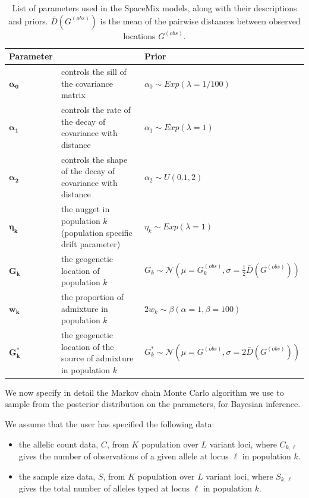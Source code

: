\documentclass[12pt]{article}
\newcommand{\identifyadmixsource}[1]{{#1^{*}}}
\begin{document}
\begin{centering}
\begin{table}
\begin{tabular}{| >{\centering\arraybackslash}m{2.0cm} | m{5.2cm} | >{\centering\arraybackslash}m{6.8cm} |}
	\hline
	\textbf{Parameter} & \centering{\textbf{Description}} & \textbf{Prior}\\ \hline
	$\boldsymbol{\alpha_0}$ & 
		controls the sill of the covariance matrix & 
		$\alpha_0 \sim Exp(\lambda = 1/100)$\\ \hline
	$\boldsymbol{\alpha_1}$ & 
		controls the rate of the decay of covariance with distance & 
		$\alpha_1 \sim Exp(\lambda = 1)$\\ \hline
	$\boldsymbol{\alpha_2}$ & 
		controls the shape of the decay of covariance with distance & 
		$\alpha_2 \sim U(0.1,2)$\\ \hline
	$\boldsymbol{\eta_k}$ & 
		the nugget in population $k$ (population specific drift parameter)  & 
		$\eta_k \sim Exp(\lambda = 1)$\\ \hline
	$\boldsymbol{G_k}$ & 
		the geogenetic location of population $k$ &
		 $G_k \sim \mathcal{N}(\mu = G^{(obs)}_k,\sigma = \frac{1}{2}\bar{D}(G^{(obs)}))$ \\ \hline
	$\boldsymbol{w_k}$ &
		the proportion of admixture in population $k$ &
		$2 w_k \sim \beta(\alpha = 1,\beta = 100)$  \\ \hline
	$\boldsymbol{\identifyadmixsource{G_k}}$ &
		the geogenetic location of the source of admixture in population $k$ &
		$\identifyadmixsource{G_k} \sim \mathcal{N}(\mu = \bar{G^{(obs)}},\sigma = 2 \bar{D}(G^{(obs)}))$ \\
	\hline
\end{tabular}
\caption{
List of parameters used in the SpaceMix models, along with their descriptions and priors.
$\bar{D}(G^{(obs)})$ is the mean of the pairwise distances between observed locations $G^{(obs)}$.
}\label{tab:param_prior_tab}
\end{table}
\end{centering}

We now specify in detail the Markov chain Monte Carlo algorithm we use to sample from the posterior distribution on the parameters,
for Bayesian inference.

We assume that the user has specified the following data: 
\begin{itemize}
\item the allelic count data, $C$, from $K$ population over $L$ variant loci, where $C_{k,\ell}$ gives the number of observations of a given allele at locus $\ell$ in population $k$. 
\item the sample size data, $S$, from $K$ population over $L$ variant loci, where $S_{k,\ell}$ gives the total number of alleles typed at locus $\ell$ in population $k$.
\end{itemize}
\end{document}
